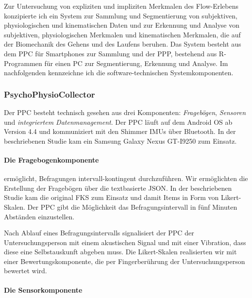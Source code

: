 \label{sub:apparat_5_1}

Zur Untersuchung von expliziten und impliziten Merkmalen des Flow-Erlebens konzipierte ich ein System zur Sammlung und Segmentierung von subjektiven, physiologischen und kinematischen Daten und zur Erkennung und Analyse von subjektiven, physiologischen Merkmalen und kinematischen Merkmalen, die auf der Biomechanik des Gehens und des Laufens beruhen. Das System besteht aus dem \ac{PPC} für Smartphones zur Sammlung und der \ac{PPP}, bestehend aus R-Programmen für einen PC zur Segmentierung, Erkennung und Analyse. Im nachfolgenden kennzeichne ich die software-technischen Systemkomponenten.

\subsubsection{PsychoPhysioCollector} 

\label{ssub:psychophysiocollector}

Der \ac{PPC} besteht technisch gesehen aus drei Komponenten: \emph{Fragebögen}, \emph{Sensoren} und \emph{integriertem Datenmanagement}. Der \ac{PPC} läuft auf dem Android OS ab Version 4.4 und kommuniziert mit den Shimmer \acp{IMU} über Bluetooth. In der beschriebenen Studie kam ein Samsung Galaxy Nexus GT-I9250 zum Einsatz.

\paragraph{Die Fragebogenkomponente} 

\label{par:die_fragebogenkomponente}

ermöglicht, Befragungen intervall-kontingent durchzuführen. Wir ermöglichten die Erstellung der Fragebögen über die textbasierte \ac{JSON}. In der beschriebenen Studie kam die original \ac{FKS} zum Einsatz und damit Items in Form von Likert-Skalen. Der \ac{PPC} gibt die Möglichkeit das Befragungsintervall in fünf Minuten Abständen einzustellen.

Nach Ablauf eines Befragungsintervalls signalisiert der \ac{PPC} der Untersuchungsperson mit einem akustischen Signal und mit einer Vibration, dass diese eine Selbstauskunft abgeben muss. Die Likert-Skalen realisierten wir mit einer Bewertungskomponente, die per Fingerberührung der Untersuchungsperson bewertet wird.

\paragraph{Die Sensorkomponente} 

